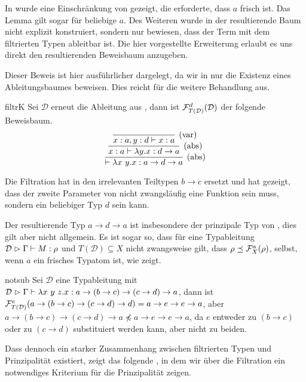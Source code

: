 \begin{remark}
    In \cite{dudenhefner} wurde eine Einschränkung von  gezeigt, die erforderte, dass $a$ frisch ist. Das Lemma gilt sogar für beliebige $a$. Des Weiteren wurde in \cite{dudenhefner} der resultierende Baum nicht explizit konstruiert, sondern nur bewiesen, dass der Term mit dem filtrierten Typen ableitbar ist. Die hier vorgestellte Erweiterung erlaubt es uns direkt den resultierenden Beweisbaum anzugeben.
    
    Dieser Beweis ist hier ausführlicher dargelegt, da wir in  nur die Existenz eines Ableitungsbaumes beweisen. Dies reicht für die weitere Behandlung aus.
\end{remark}
\begin{example}{}{filtrK}
    Sei $\mathcal{D}$ erneut die Ableitung aus , dann ist $\mathcal{F}^d_{T(\mathcal{D})}(\mathcal{D})$ der folgende Beweisbaum.
    \[\infer[\text{(abs)}]{\vdash\lambda x~y.x:a\to d\to a}{\infer[\text{(abs)}]{x:a\vdash \lambda y.x:d\to a}{\infer[\text{(var)}]{x:a, y:d\vdash x:a}{}}}
    \]
\end{example}
Die Filtration hat in  den irrelevanten Teiltypen $b\to c$ ersetzt und hat gezeigt, dass der zweite Parameter von \tK{} nicht zwangsläufig eine Funktion sein muss, sondern ein beliebiger Typ $d$ sein kann.

Der resultierende Typ $a\to d\to a$ ist insbesondere der prinzipale Typ von \tK, dies gilt aber nicht allgemein. Es ist sogar so, dass für eine Typableitung $\mathcal{D}\vartriangleright\Gamma\vdash M:\rho$ und $T(\mathcal{D})\subseteq X$ nicht zwangsweise gilt, dass $\rho\preceq\mathcal{F}^a_X(\rho)$, selbst, wenn $a$ ein frisches Typatom ist, wie  zeigt.
\begin{example}{}{notsub}
    Sei $\mathcal{D}$ eine Typableitung mit $\mathcal{D}\vartriangleright\Gamma\vdash\lambda x~y~z.x:a\to(b\to c)\to(c\to d)\to a$, dann ist $\mathcal{F}^e_{T(\mathcal{D})}(a\to(b\to c)\to(c\to d)\to d)=a\to e\to e\to a$, aber $a\to(b\to c)\to(c\to d)\to a\not\preceq a\to e\to e\to a$, da $e$ entweder zu $(b\to c)$ oder zu $(c\to d)$ substituiert werden kann, aber nicht zu beiden.
\end{example}

Dass dennoch ein starker Zusammenhang zwischen filtrierten Typen und Prinzipalität existiert, zeigt das folgende , in dem wir über die Filtration ein notwendiges Kriterium für die Prinzipalität zeigen.

